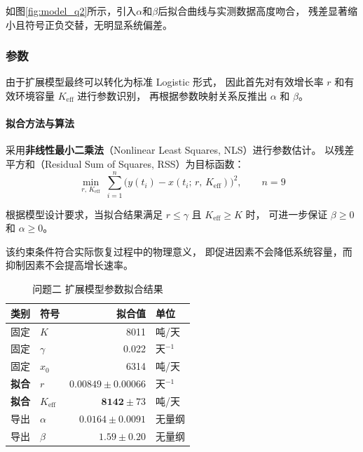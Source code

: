 \documentclass[12pt,a4paper]{ctexart}
\begin{document}
如图\ref{fig:model_q2}所示，引入$\alpha$和$\beta$后拟合曲线与实测数据高度吻合，
残差显著缩小且符号正负交替，无明显系统偏差。

\subsubsection{参数}

由于扩展模型最终可以转化为标准 Logistic 形式，
因此首先对有效增长率 $r$ 和有效环境容量 $K_{\text{eff}}$ 进行参数识别，
再根据参数映射关系反推出 $\alpha$ 和 $\beta$。

\paragraph{拟合方法与算法}

采用\textbf{非线性最小二乘法}（Nonlinear Least Squares, NLS）进行参数估计。
以残差平方和（Residual Sum of Squares, RSS）为目标函数：
\begin{equation}
\min_{r,\,K_{\text{eff}}} \;
\sum_{i=1}^{n} \bigl(y(t_i) - x(t_i;\, r,\,K_{\text{eff}})\bigr)^2,\qquad
n = 9
\end{equation}

根据模型设计要求，当拟合结果满足
$r\le\gamma$ 且 $K_{\text{eff}}\ge K$ 时，
可进一步保证 $\beta\ge0$ 和 $\alpha\ge0$。

该约束条件符合实际恢复过程中的物理意义，
即促进因素不会降低系统容量，而抑制因素不会提高增长速率。


\begin{table}[htbp]
\centering
\caption{问题二 扩展模型参数拟合结果}
\label{tab:q2_params}
\begin{tabular}{llrl}
\toprule
类别 & 符号 & 拟合值 & 单位 \\
\midrule
固定  & $K$                & 8011        & 吨/天 \\
固定  & $\gamma$           & 0.022       & 天$^{-1}$ \\
固定  & $x_0$              & 6314        & 吨/天 \\
\midrule
\textbf{拟合} & $r$                & $\mathbf{0.00849} \pm 0.00066$ & 天$^{-1}$ \\
\textbf{拟合} & $K_{\text{eff}}$   & $\mathbf{8142} \pm 73$ & 吨/天 \\
\midrule
导出  & $\alpha$           & $\mathbf{0.0164} \pm 0.0091$ & 无量纲 \\
导出  & $\beta$            & $\mathbf{1.59} \pm 0.20$ & 无量纲 \\
\bottomrule
\end{tabular}
\end{table}
\end{document}
